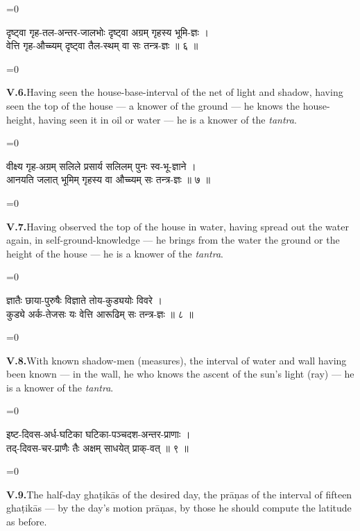 \documentclass[11pt,a4paper]{article}
\newcommand{\dev}[1]{{\devanagarifont\color{sktcolor}#1}}
\newcommand{\iast}[1]{\textit{#1}}
\newenvironment{paracol}[1]{\begingroup}{\endgroup}
\newcommand{\switchcolumn}[1][]{%
  \ifnum#1=0\relax\else\par\nobreak\vspace{0.5em}\par\nobreak\fi%
}
\begin{document}
\vspace{0.3cm}

\begin{paracol}{2}
\switchcolumn[0]
\dev{%
दृष्ट्वा गृह-तल-अन्तर-जालभोः दृष्ट्वा अग्रम् गृहस्य भूमि-ज्ञः ।\\
वेत्ति गृह-औच्च्यम् दृष्ट्वा तैल-स्थम् वा सः तन्त्र-ज्ञः ॥ ६ ॥
}

\switchcolumn[1]
\textbf{V.6.}\quad Having seen the house-base-interval of the net
of light and shadow, having seen the top of the house — a
knower of the ground — he knows the house-height, having seen
it in oil or water — he is a knower of the \iast{tantra}.
\end{paracol}

\vspace{0.3cm}

\begin{paracol}{2}
\switchcolumn[0]
\dev{%
वीक्ष्य गृह-अग्रम् सलिले प्रसार्य सलिलम् पुनः स्व-भू-ज्ञाने ।\\
आनयति जलात् भूमिम् गृहस्य वा औच्च्यम् सः तन्त्र-ज्ञः ॥ ७ ॥
}

\switchcolumn[1]
\textbf{V.7.}\quad Having observed the top of the house in water,
having spread out the water again, in self-ground-knowledge —
he brings from the water the ground or the height of the house
— he is a knower of the \iast{tantra}.
\end{paracol}

\vspace{0.3cm}

\begin{paracol}{2}
\switchcolumn[0]
\dev{%
ज्ञातैः छाया-पुरुषैः विज्ञाते तोय-कुड्ययोः विवरे ।\\
कुड्ये अर्क-तेजसः यः वेत्ति आरूढिम् सः तन्त्र-ज्ञः ॥ ८ ॥
}

\switchcolumn[1]
\textbf{V.8.}\quad With known shadow-men (measures), the interval
of water and wall having been known — in the wall, he who knows
the ascent of the sun's light (ray) — he is a knower of the
\iast{tantra}.
\end{paracol}

\vspace{0.3cm}

\begin{paracol}{2}
\switchcolumn[0]
\dev{%
इष्ट-दिवस-अर्ध-घटिका घटिका-पञ्चदश-अन्तर-प्राणाः ।\\
तद्-दिवस-चर-प्राणैः तैः अक्षम् साधयेत् प्राक्-वत् ॥ ९ ॥
}

\switchcolumn[1]
\textbf{V.9.}\quad The half-day ghaṭikās of the desired day, the
prāṇas of the interval of fifteen ghaṭikās — by the day's motion
prāṇas, by those he should compute the latitude as before.
\end{paracol}
\end{document}
